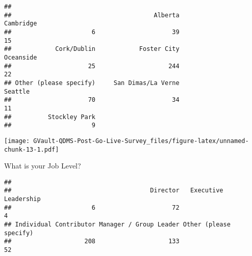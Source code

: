 \documentclass[
]{article}
\newenvironment{Shaded}{\begin{snugshade}}{\end{snugshade}}
\newcommand{\DataTypeTok}[1]{\textcolor[rgb]{0.13,0.29,0.53}{#1}}
\newcommand{\DecValTok}[1]{\textcolor[rgb]{0.00,0.00,0.81}{#1}}
\newcommand{\FloatTok}[1]{\textcolor[rgb]{0.00,0.00,0.81}{#1}}
\newcommand{\KeywordTok}[1]{\textcolor[rgb]{0.13,0.29,0.53}{\textbf{#1}}}
\newcommand{\NormalTok}[1]{#1}
\newcommand{\OperatorTok}[1]{\textcolor[rgb]{0.81,0.36,0.00}{\textbf{#1}}}
\newcommand{\StringTok}[1]{\textcolor[rgb]{0.31,0.60,0.02}{#1}}
\begin{document}
\begin{verbatim}
## 
##                                       Alberta              Cambridge 
##                      6                     39                     15 
##            Cork/Dublin            Foster City              Oceanside 
##                     25                    244                     22 
## Other (please specify)     San Dimas/La Verne                Seattle 
##                     70                     34                     11 
##          Stockley Park 
##                      9
\end{verbatim}

\begin{Shaded}
\end{Shaded}

\texttt{[image: GVault-QDMS-Post-Go-Live-Survey\_files/figure-latex/unnamed-chunk-13-1.pdf]}

What is your Job Level?

\begin{Shaded}
\end{Shaded}

\begin{verbatim}
## 
##                                      Director   Executive Leadership 
##                      6                     72                      4 
## Individual Contributor Manager / Group Leader Other (please specify) 
##                    208                    133                     52
\end{verbatim}

\begin{Shaded}
\end{Shaded}
\end{document}
